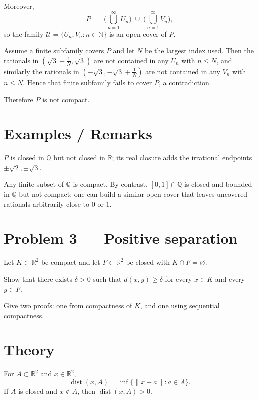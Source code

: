 \documentclass[12pt,a4paper]{article}
\theoremstyle{plain}
\theoremstyle{definition}
\theoremstyle{remark}
\theoremstyle{remark}
\begin{document}
Moreover,
\[
P \;=\; \Big( \bigcup_{n=1}^{\infty} U_n \Big) \;\cup\; \Big( \bigcup_{n=1}^{\infty} V_n \Big),
\]
so the family \(\mathcal{U}=\{U_n, V_n : n\in\mathbb{N}\}\) is an open cover of \(P\).

Assume a finite subfamily covers \(P\) and let \(N\) be the largest index used.
Then the rationals in \((\sqrt{3}-\tfrac{1}{N}, \sqrt{3})\) are not contained in any \(U_n\) with \(n\le N\), and similarly the rationals in \((-\sqrt{3}, -\sqrt{3}+\tfrac{1}{N})\) are not contained in any \(V_n\) with \(n\le N\).
Hence that finite subfamily fails to cover \(P\), a contradiction.

Therefore \(P\) is not compact.

\bigskip

\section*{Examples / Remarks}

\(P\) is closed in \(\mathbb{Q}\) but not closed in \(\mathbb{R}\); its real closure adds the irrational endpoints \(\pm \sqrt{2}, \pm \sqrt{3}\).

Any finite subset of \(\mathbb{Q}\) is compact. By contrast, \([0,1]\cap\mathbb{Q}\) is closed and bounded in \(\mathbb{Q}\) but not compact; one can build a similar open cover that leaves uncovered rationals arbitrarily close to \(0\) or \(1\).

\section*{Problem 3 — Positive separation}

Let \(K\subset \mathbb{R}^2\) be compact and let \(F\subset \mathbb{R}^2\) be closed with \(K\cap F=\varnothing\).

Show that there exists \(\delta>0\) such that \(d(x,y)\ge \delta\) for every \(x\in K\) and every \(y\in F\).

Give two proofs: one from compactness of \(K\), and one using sequential compactness.

\bigskip

\section*{Theory}

For \(A\subset\mathbb{R}^2\) and \(x\in\mathbb{R}^2\),
\[
\operatorname{dist}(x,A)=\inf\{\|x-a\|:a\in A\}.
\]
If \(A\) is closed and \(x\notin A\), then \(\operatorname{dist}(x,A)>0\).
\end{document}
